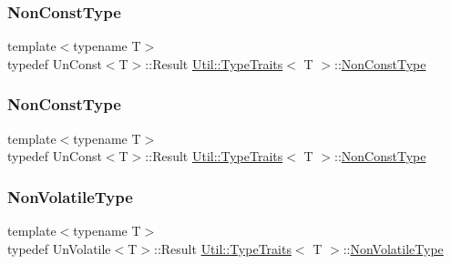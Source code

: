 \subsubsection{\texorpdfstring{NonConstType}{NonConstType}\hspace{0.1cm}{\footnotesize\ttfamily [1/2]}}
{\footnotesize\ttfamily template$<$typename T$>$ \\
typedef Un\+Const$<$T$>$\+::Result \mbox{\hyperlink{classUtil_1_1TypeTraits}{Util\+::\+Type\+Traits}}$<$ T $>$\+::\mbox{\hyperlink{classUtil_1_1TypeTraits_a4fd9a7bd65b33d0ac3e035024ff0d8f0}{Non\+Const\+Type}}}

\mbox{\label{classUtil_1_1TypeTraits_a4fd9a7bd65b33d0ac3e035024ff0d8f0}} 
\subsubsection{\texorpdfstring{NonConstType}{NonConstType}\hspace{0.1cm}{\footnotesize\ttfamily [2/2]}}
{\footnotesize\ttfamily template$<$typename T$>$ \\
typedef Un\+Const$<$T$>$\+::Result \mbox{\hyperlink{classUtil_1_1TypeTraits}{Util\+::\+Type\+Traits}}$<$ T $>$\+::\mbox{\hyperlink{classUtil_1_1TypeTraits_a4fd9a7bd65b33d0ac3e035024ff0d8f0}{Non\+Const\+Type}}}

\mbox{\label{classUtil_1_1TypeTraits_a8ffbb0166d5a321e021ac2171f2d4981}} 
\subsubsection{\texorpdfstring{NonVolatileType}{NonVolatileType}\hspace{0.1cm}{\footnotesize\ttfamily [1/2]}}
{\footnotesize\ttfamily template$<$typename T$>$ \\
typedef Un\+Volatile$<$T$>$\+::Result \mbox{\hyperlink{classUtil_1_1TypeTraits}{Util\+::\+Type\+Traits}}$<$ T $>$\+::\mbox{\hyperlink{classUtil_1_1TypeTraits_a8ffbb0166d5a321e021ac2171f2d4981}{Non\+Volatile\+Type}}}

